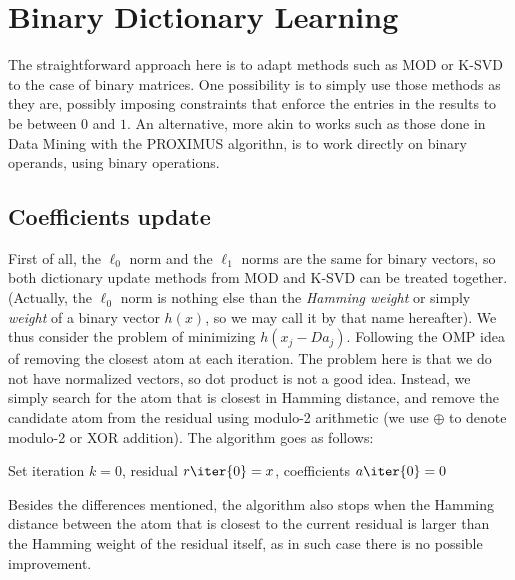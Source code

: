 \documentclass[a4paper,11pt]{article}
\begin{document}
\section{Binary Dictionary Learning}

The straightforward approach here is to adapt methods such as MOD or K-SVD to the case of binary matrices. One possibility is to simply use those methods as they are, possibly imposing constraints that enforce the entries in the results to be between $0$ and $1$.
An alternative, more akin to works such as those done in Data Mining with the PROXIMUS algorithn, is to work directly on binary operands, using binary operations. 

\subsection{Coefficients update}

First of all, the $\ell_0$ norm and the $\ell_1$ norms are the same for binary vectors, so both dictionary update methods from MOD and K-SVD can be treated together. (Actually, the $\ell_0$ norm is nothing else than the \emph{Hamming weight} or simply \emph{weight} of a binary vector $h(x)$, so we may call it by that name hereafter). 
We thus consider the problem of minimizing $h(x_j - Da_j)$. Following the OMP idea of removing the closest atom at each iteration. The problem here is that we do not have normalized vectors, so dot product is not a good idea. 
Instead, we simply search for the atom that is closest in Hamming distance, and remove the candidate atom from the residual using modulo-2 arithmetic (we use $\oplus$ to denote modulo-2 or XOR addition). The algorithm goes as follows:

\begin{algorithm}[ht]
Set iteration $k=0$, residual $r\iter{0}=x$, coefficients $a\iter{0}=0$\;
\label{alg:bmp}
\end{algorithm}

Besides the differences mentioned, the algorithm also stops when the Hamming distance between the atom that is closest to the current residual is larger than the Hamming weight of the residual itself, as in such case there is no possible improvement.
 
\end{document}
